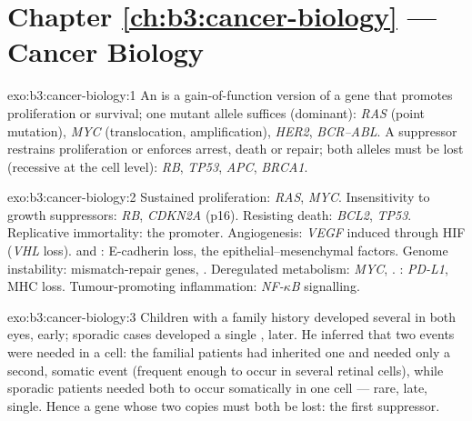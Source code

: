 \section*{Chapter \ref{ch:b3:cancer-biology} --- Cancer Biology}

\begin{solution}{exo:b3:cancer-biology:1}
An  is a gain-of-function version of a gene that promotes
proliferation or survival; one mutant allele suffices (dominant):
\emph{RAS} (point mutation), \emph{MYC} (translocation, amplification),
\emph{HER2}, \emph{BCR--ABL}. A  suppressor restrains
proliferation or enforces arrest, death or repair; both alleles must be
lost (recessive at the cell level): \emph{RB}, \emph{TP53}, \emph{APC},
\emph{BRCA1}.
\end{solution}

\begin{solution}{exo:b3:cancer-biology:2}
Sustained proliferation: \emph{RAS}, \emph{MYC}. Insensitivity to
growth suppressors: \emph{RB}, \emph{CDKN2A} (p16). Resisting death:
\emph{BCL2}, \emph{TP53}. Replicative immortality: the 
promoter. Angiogenesis: \emph{VEGF} induced through HIF (\emph{VHL}
loss).  and : E-cadherin loss, the
epithelial--mesenchymal factors. Genome instability: mismatch-repair
genes, \emph{}. Deregulated metabolism: \emph{MYC}, .
: \emph{PD-L1}, MHC loss. Tumour-promoting inflammation:
\emph{NF-$\kappa$B} signalling.
\end{solution}

\begin{solution}{exo:b3:cancer-biology:3}
Children with a family history developed several  in both eyes,
early; sporadic cases developed a single , later. He inferred that
two events were needed in a cell: the familial patients had inherited
one and needed only a second, somatic event (frequent enough to occur
in several retinal cells), while sporadic patients needed both to occur
somatically in one cell --- rare, late, single. Hence a gene whose two
copies must both be lost: the first  suppressor.
\end{solution}

